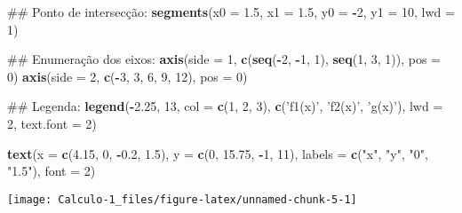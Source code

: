 \documentclass[]{book}
\newenvironment{Shaded}{\begin{snugshade}}{\end{snugshade}}
\newcommand{\KeywordTok}[1]{\textcolor[rgb]{0.13,0.29,0.53}{\textbf{#1}}}
\newcommand{\DataTypeTok}[1]{\textcolor[rgb]{0.13,0.29,0.53}{#1}}
\newcommand{\DecValTok}[1]{\textcolor[rgb]{0.00,0.00,0.81}{#1}}
\newcommand{\FloatTok}[1]{\textcolor[rgb]{0.00,0.00,0.81}{#1}}
\newcommand{\StringTok}[1]{\textcolor[rgb]{0.31,0.60,0.02}{#1}}
\newcommand{\OperatorTok}[1]{\textcolor[rgb]{0.81,0.36,0.00}{\textbf{#1}}}
\newcommand{\NormalTok}[1]{#1}
\begin{document}
\begin{Shaded}
\begin{Highlighting}[]
\NormalTok{##  Ponto de intersecção:}
\KeywordTok{segments}\NormalTok{(}\DataTypeTok{x0 =} \FloatTok{1.5}\NormalTok{, }\DataTypeTok{x1 =} \FloatTok{1.5}\NormalTok{,}
         \DataTypeTok{y0 =} \OperatorTok{-}\DecValTok{2}\NormalTok{, }\DataTypeTok{y1 =} \DecValTok{10}\NormalTok{, }\DataTypeTok{lwd =} \DecValTok{1}\NormalTok{)}

\NormalTok{##  Enumeração dos eixos:}
\KeywordTok{axis}\NormalTok{(}\DataTypeTok{side =} \DecValTok{1}\NormalTok{, }\KeywordTok{c}\NormalTok{(}\KeywordTok{seq}\NormalTok{(}\OperatorTok{-}\DecValTok{2}\NormalTok{, }\OperatorTok{-}\DecValTok{1}\NormalTok{, }\DecValTok{1}\NormalTok{), }\KeywordTok{seq}\NormalTok{(}\DecValTok{1}\NormalTok{, }\DecValTok{3}\NormalTok{, }\DecValTok{1}\NormalTok{)), }\DataTypeTok{pos =} \DecValTok{0}\NormalTok{)}
\KeywordTok{axis}\NormalTok{(}\DataTypeTok{side =} \DecValTok{2}\NormalTok{, }\KeywordTok{c}\NormalTok{(}\OperatorTok{-}\DecValTok{3}\NormalTok{, }\DecValTok{3}\NormalTok{, }\DecValTok{6}\NormalTok{, }\DecValTok{9}\NormalTok{, }\DecValTok{12}\NormalTok{), }\DataTypeTok{pos =} \DecValTok{0}\NormalTok{)}

\NormalTok{##  Legenda:}
\KeywordTok{legend}\NormalTok{(}\OperatorTok{-}\FloatTok{2.25}\NormalTok{, }\DecValTok{13}\NormalTok{, }\DataTypeTok{col =} \KeywordTok{c}\NormalTok{(}\DecValTok{1}\NormalTok{, }\DecValTok{2}\NormalTok{, }\DecValTok{3}\NormalTok{), }\KeywordTok{c}\NormalTok{(}\StringTok{'f1(x)'}\NormalTok{, }\StringTok{'f2(x)'}\NormalTok{, }\StringTok{'g(x)'}\NormalTok{),}
       \DataTypeTok{lwd =} \DecValTok{2}\NormalTok{, }\DataTypeTok{text.font =} \DecValTok{2}\NormalTok{)}

\KeywordTok{text}\NormalTok{(}\DataTypeTok{x =} \KeywordTok{c}\NormalTok{(}\FloatTok{4.15}\NormalTok{, }\DecValTok{0}\NormalTok{, }\OperatorTok{-}\FloatTok{0.2}\NormalTok{, }\FloatTok{1.5}\NormalTok{), }\DataTypeTok{y =} \KeywordTok{c}\NormalTok{(}\DecValTok{0}\NormalTok{, }\FloatTok{15.75}\NormalTok{, }\OperatorTok{-}\DecValTok{1}\NormalTok{, }\DecValTok{11}\NormalTok{),}
     \DataTypeTok{labels =} \KeywordTok{c}\NormalTok{(}\StringTok{"x"}\NormalTok{, }\StringTok{"y"}\NormalTok{, }\StringTok{"0"}\NormalTok{, }\StringTok{"1.5"}\NormalTok{), }\DataTypeTok{font =} \DecValTok{2}\NormalTok{)}
\end{Highlighting}
\end{Shaded}

\begin{center}\texttt{[image: Calculo-1\_files/figure-latex/unnamed-chunk-5-1]} \end{center}
\end{document}
